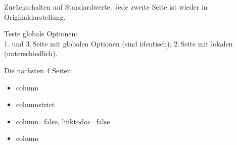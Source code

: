 \documentclass[a4paper]{article}
\begin{document}
\Huge




\begingroup
Zur\"uckschalten auf Standardwerte.
Jede zweite Seite ist wieder in Originaldarstellung.











\endgroup


\begingroup
Teste globale Optionen:\\
1. und 3.\,Seite mit globalen Optionen (sind identisch),
2.\,Seite mit lokalen (unterschiedlich).




\endgroup

\begingroup
Die n\"achsten 4 Seiten:
\begin{itemize}
  \item column
  \item columnstrict
  \item column=false, linktodoc=false
  \item column
\end{itemize}




\endgroup

\begingroup

\endgroup
\end{document}
